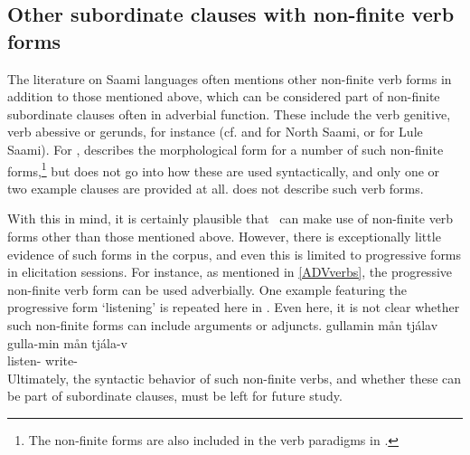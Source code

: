 \subsection{Other subordinate clauses with non-finite verb forms}\label{otherSubclauses}
The literature on Saami languages often mentions other non-finite verb forms in addition to those mentioned above, which can be considered part of non-finite subordinate clauses often in adverbial function. These include the verb genitive, verb abessive or gerunds, for instance (cf. \citet[103-104]{Sammallahti1998} and \citet[67-73]{Svonni2009} for North Saami, or \citet[104-111]{Spiik1989} for Lule Saami). 
For \PS, \citet[95-106]{Lehtiranta1992} describes the morphological form for a number of such non-finite forms,\footnote{The non-finite forms are also included in the verb paradigms in \citet[150-155]{Lehtiranta1992}.} 
but does not go into how these are used syntactically, and only one or two example clauses are provided at all. \citet{Lagercrantz1926} does not describe such verb forms. 

With this in mind, it is certainly plausible that \PS\ can make use of non-finite verb forms other than those mentioned above. However, there is exceptionally little evidence of such forms in the corpus, and even this is limited to progressive forms in elicitation sessions. For instance, as mentioned in \SEC\ref{ADVverbs}, the progressive non-finite verb form can be used adverbially. One example featuring the progressive form  ‘listening’ is repeated here in . Even here, it is not clear whether such non-finite forms can include arguments or adjuncts. 
\ea\label{ADVverbsEx2repeat}%
\glll	gullamin mån tjálav\\
	gulla-min mån tjála-v\\
	listen-  write-\\\nopagebreak
{}	
\z
Ultimately, the syntactic behavior of such non-finite verbs, and whether these can be part of subordinate clauses, must be left for future study.  



